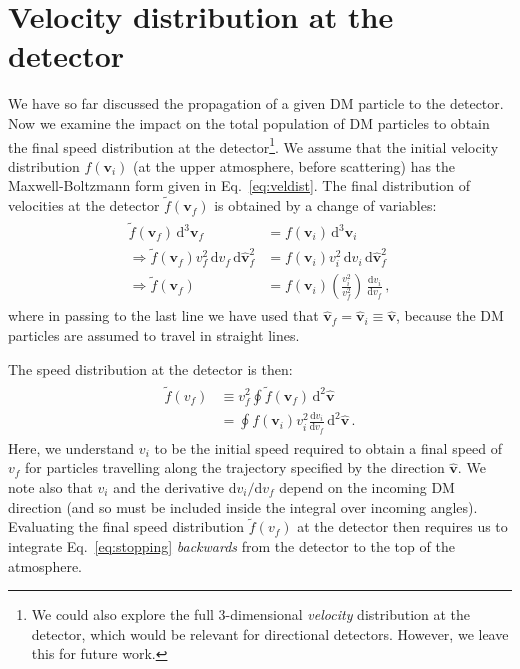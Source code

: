 \documentclass[prd,twocolumn,showpacs,nofootinbib,aps]{revtex4-1}
\newcommand{\dbd}[2]{\frac{\mathrm{d}#1}{\mathrm{d}#2}}
\begin{document}

\section{Velocity distribution at the detector}
\label{sec:VelDist}
We have so far discussed the propagation of a given DM particle to the detector. Now we examine the impact on the total population of DM particles to obtain the final speed distribution at the detector\footnote{We could also explore the full 3-dimensional \textit{velocity} distribution at the detector, which would be relevant for directional detectors. However, we leave this for future work.}. We assume that the initial velocity distribution $f(\mathbf{v}_i)$ (at the upper atmosphere, before scattering) has the Maxwell-Boltzmann form given in Eq.~\eqref{eq:veldist}. The final distribution of velocities at the detector $\tilde{f}(\mathbf{v}_f)$ is obtained by a change of variables:
\begin{align}
\begin{split}
\tilde{f}(\mathbf{v}_f) \, \mathrm{d}^3 \mathbf{v}_f &= f(\mathbf{v}_i) \, \mathrm{d}^3 \mathbf{v}_i\\
\Rightarrow  \tilde{f}(\mathbf{v}_f) v_f^2 \,\mathrm{d}v_f \,\mathrm{d}\hat{\mathbf{v}}_f^2 &= f(\mathbf{v}_i) v_i^2\,\mathrm{d}v_i \,\mathrm{d}\hat{\mathbf{v}}_f^2\\
\Rightarrow \tilde{f}(\mathbf{v}_f)  &= f(\mathbf{v}_i) \left(\frac{v_i^2}{v_f^2}\right) \,\dbd{v_i}{v_f}\,,
\end{split}
\end{align}
where in passing to the last line we have used that $\hat{\mathbf{v}}_f = \hat{\mathbf{v}}_i \equiv \hat{\mathbf{v}}$, because the DM particles are assumed to travel in straight lines.

The speed distribution at the detector is then:
\begin{align}
\begin{split}
\label{eq:finaldist}
\tilde{f}(v_f) &\equiv v_f^2 \oint \tilde{f}(\mathbf{v}_f) \, \mathrm{d}^2\hat{\mathbf{v}}\\
&= \oint f(\mathbf{v}_i) v_i^2 \dbd{v_i}{v_f} \, \mathrm{d}^2\hat{\mathbf{v}}\,.
\end{split}
\end{align}
Here, we understand $v_i$ to be the initial speed required to obtain a final speed of $v_f$ for particles travelling along the trajectory specified by the direction $\hat{\mathbf{v}}$. We note also that $v_i$ and the derivative $\mathrm{d}v_i/\mathrm{d}v_f$ depend on the incoming DM direction (and so must be included inside the integral over incoming angles). Evaluating the final speed distribution $\tilde{f}(v_f)$ at the detector then requires us to integrate Eq.~\eqref{eq:stopping} \textit{backwards} from the detector to the top of the atmosphere. 
\end{document}
